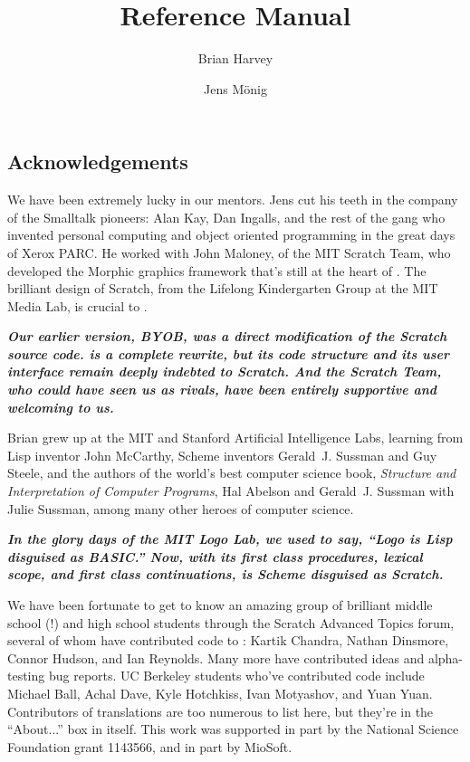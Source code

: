 \documentclass{report}
\begin{document}
\title{\Snap{} Reference Manual}
\author{Brian Harvey \and Jens M\"{o}nig}
\date{}

\maketitle

\tableofcontents

\chapter*{}
\section*{Acknowledgements}

We have been extremely lucky in our mentors. Jens cut his teeth in the company of the Smalltalk pioneers: Alan Kay, Dan Ingalls, and the rest of the gang who invented personal computing and object oriented programming in the great days of Xerox PARC. He worked with John Maloney, of the MIT Scratch Team, who developed the Morphic graphics framework that's still at the heart of \Snap{}. The brilliant design of Scratch, from the Lifelong Kindergarten Group at the MIT Media Lab, is crucial to \Snap{}.

\textbf{\emph{Our earlier version, BYOB, was a direct modification of the Scratch source code. \Snap{} is a complete rewrite, but its code structure and its user interface remain deeply indebted to Scratch. And the Scratch Team, who could have seen us as rivals, have been entirely supportive and welcoming to us.}}

Brian grew up at the MIT and Stanford Artificial Intelligence Labs, learning from Lisp inventor John McCarthy, Scheme inventors Gerald~J. Sussman and Guy Steele, and the authors of the world's best computer science book, \textit{Structure and Interpretation of Computer Programs}, Hal Abelson and Gerald~J. Sussman with Julie Sussman, among many other heroes of computer science.

\textbf{\emph{In the glory days of the MIT Logo Lab, we used to say, ``Logo is Lisp disguised as BASIC.'' Now, with its first class procedures, lexical scope, and first class continuations, \Snap{} is Scheme disguised as Scratch.}}

We have been fortunate to get to know an amazing group of brilliant middle school (!\@) and high school students through the Scratch Advanced Topics forum, several of whom have contributed code to \Snap{}: Kartik Chandra, Nathan Dinsmore, Connor Hudson, and Ian Reynolds. Many more have contributed ideas and alpha-testing bug reports. UC Berkeley students who've contributed code include Michael Ball, Achal Dave, Kyle Hotchkiss, Ivan Motyashov, and Yuan Yuan. Contributors of translations are too numerous to list here, but they're in the ``About...'' box in \Snap{} itself. This work was supported in part by the National Science Foundation grant 1143566, and in part by MioSoft.
\end{document}
